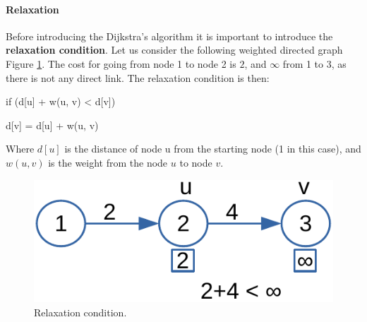 \paragraph{Relaxation}
Before introducing the Dijkstra's algorithm it is important to introduce the \textbf{relaxation condition}. Let us consider the following weighted directed graph Figure \ref{graphs_12}. The cost for going from node 1 to node 2 is \(2\), and \(\infty\) from 1 to 3, as there is not any direct link. The relaxation condition is then:

\begin{definition}
\enspace \enspace \textnormal{if (d[u] + w(u, v) < d[v])}

\enspace \enspace \enspace     \textnormal{d[v] = d[u] + w(u, v)}

Where \(d[u]\) is the distance of node u from the starting node (1 in this case), and \(w(u, v)\) is the weight from the node \(u\) to node \(v\).
\end{definition}

\begin{figure}[H]
	\begin{center}
		\includegraphics[scale=.6]{chapters/graphs/images/graphs_12.pdf}
		\caption[Relaxation condition.]{Relaxation condition.}
		\label{graphs_12}
	\end{center}
\end{figure}

